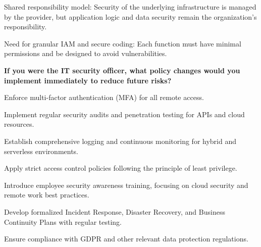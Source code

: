 Shared responsibility model: Security of the underlying infrastructure is managed by the provider, but application logic and data security remain the organization’s responsibility.

Need for granular IAM and secure coding: Each function must have minimal permissions and be designed to avoid vulnerabilities.

\bigskip

\noindent\textbf{If you were the IT security officer, what policy changes would you implement immediately to reduce future risks?}

Enforce multi-factor authentication (MFA) for all remote access.

Implement regular security audits and penetration testing for APIs and cloud resources.

Establish comprehensive logging and continuous monitoring for hybrid and serverless environments.

Apply strict access control policies following the principle of least privilege.

Introduce employee security awareness training, focusing on cloud security and remote work best practices.

Develop formalized Incident Response, Disaster Recovery, and Business Continuity Plans with regular testing.

Ensure compliance with GDPR and other relevant data protection regulations.